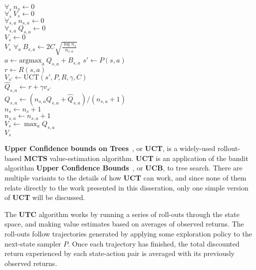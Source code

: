 \begin{algorithm}[tb]
	\caption{$\mbox{UCT}(s, P, R, \gamma, C)$}
	\label{alg:uct}
	$\forall_{s} ~ n_{s} \leftarrow 0$\\
	$\forall_{s} ~ V_{s} \leftarrow 0$\\
	$\forall_{s,a} ~ n_{s,a} \leftarrow 0$\\
	$\forall_{s,a} ~ Q_{s,a} \leftarrow 0$\\

	 {
		$V_s \leftarrow 0$\\
		\Return $V_s$
	}
	 {
		$\forall_a ~ B_{s,a} \leftarrow 2 C \sqrt{\frac{\log n_{s}}{n_{s,a}}}$\\
		$a \leftarrow \mbox{argmax}_a ~ Q_{s,a}+B_{s,a}$
	}
	$s' \leftarrow P(s,a)$\\
	$r \leftarrow R(s,a)$\\
	$V_{s'} \leftarrow \mbox{UCT}(s', P, R, \gamma, C)$\\
	$\hat Q_{s,a} \leftarrow r+\gamma v_{s'}$\\
	$Q_{s,a} \leftarrow (n_{s,a}Q_{s,a}+\hat Q_{s,a})/(n_{s,a}+1)$\\
	$n_s \leftarrow n_s+1$\\
	$n_{s,a} \leftarrow n_{s,a}+1$\\
	$V_s \leftarrow \max_a Q_{s,a}$\\
	\Return $V_s$
\end{algorithm}

{\bf Upper Confidence bounds on Trees}~\cite{kocsis06}, or {\bf UCT}, is a widely-used rollout-based {\bf MCTS} value-estimation algorithm. {\bf UCT} is an application of the bandit algorithm {\bf Upper Confidence Bounds}~\cite{auer02}, or {\bf UCB}, to tree search. There are multiple variants to the details of how {\bf UCT} can work, and since none of them relate directly to the work presented in this disseration, only one simple version of {\bf UCT} will be discussed.

The {\bf UTC} algorithm works by running a series of roll-outs through the state space, and making value estimates based on averages of observed returns. The roll-outs follow trajectories generated by applying some exploration policy to the next-state sampler $P$. Once each trajectory has finished, the total discounted return experienced by each state-action pair is averaged with its previously observed returns.

